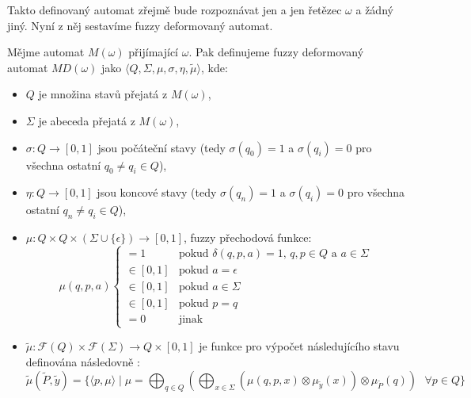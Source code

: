 \documentclass[a4paper,10pt]{article}
\begin{document}
Takto definovaný automat zřejmě bude rozpoznávat jen a jen řetězec $\omega$ a žádný jiný. Nyní z něj sestavíme fuzzy deformovaný automat.

\begin{definition}
  Mějme automat $M(\omega)$ přijímající $\omega$. Pak definujeme fuzzy deformovaný automat $MD(\omega)$ jako $\langle Q, \Sigma, \mu, \sigma, \eta, \widetilde{\mu} \rangle$, kde:
  \begin{itemize}
   \item $Q$ je množina stavů přejatá z $M(\omega)$,
   \item $\Sigma$ je abeceda přejatá z $M(\omega)$,
   \item $\sigma: Q \rightarrow [0, 1]$ jsou počáteční stavy (tedy $\sigma(q_0) = 1$ a $\sigma(q_i) = 0$ pro všechna ostatní $q_0 \neq q_i \in Q$),  
   \item $\eta:   Q \rightarrow [0, 1]$ jsou koncové stavy (tedy $\sigma(q_n) = 1$ a $\sigma(q_i) = 0$ pro všechna ostatní $q_n \neq q_i \in Q$),
   \item $\mu:    Q \times Q \times (\Sigma \cup \{ \epsilon \}) \rightarrow [0, 1]$, fuzzy přechodová funkce: 
    $$
      \mu(q, p, a)
      \begin{cases}
	= 1  		&\text{pokud $\delta(q, p, a) = 1$, $q, p \in Q$ a $a \in \Sigma$} \\
	\in [0, 1]  	&\text{pokud $a = \epsilon$} \\
	\in [0, 1] 	&\text{pokud $a \in \Sigma$} \\
	\in [0, 1] 	&\text{pokud $p = q$} \\
	= 0 		&\text{jinak}
      \end{cases}
    $$
    \item $\widetilde{\mu}: \mathcal{F}(Q) \times \mathcal{F}(\Sigma) \rightarrow Q \times [0, 1]$ je funkce pro výpočet následujícího stavu definována následovně :
    $$
    \widetilde{\mu}(\widetilde{P}, \widetilde{y}) = \{ \langle p, \mu \rangle \mid
      \mu = \bigoplus_{q \in Q} ( \bigoplus_{x \in \Sigma} ( 
	\mu(q, p, x) \otimes \mu_{\widetilde{y}} (x) )
      \otimes \mu_{\widetilde{P}}(q) )
      \text{ $\forall p \in Q$} \}
    $$
  \end{itemize}
\end{definition}

\end{document}
